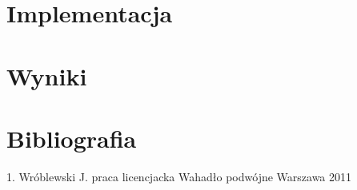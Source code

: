 \documentclass[11pt]{aghdpl}
\begin{document}
\section{Implementacja}

\section{Wyniki}






\section{Bibliografia}
1. Wróblewski J. praca licencjacka Wahadło podwójne Warszawa 2011
\end{document}
